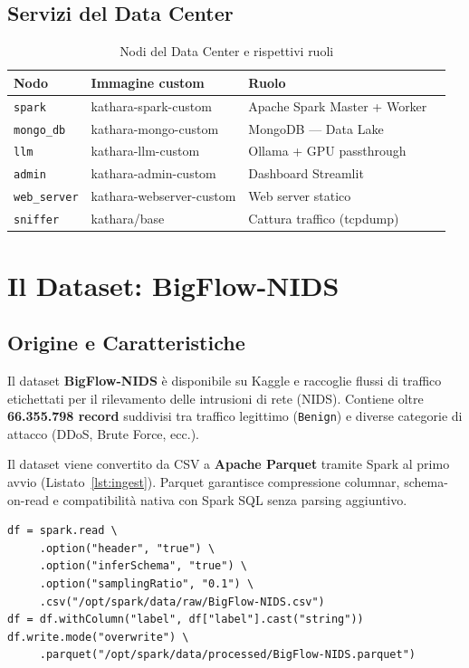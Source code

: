 \documentclass[10pt,a4paper]{article}
\begin{document}
\subsection{Servizi del Data Center}
\begin{table}[H]
\centering
\small
\begin{tabularx}{\textwidth}{@{}lll X@{}}
\toprule
\textbf{Nodo} & \textbf{Immagine custom} & \textbf{Ruolo} \\
\midrule
\texttt{spark}      & kathara-spark-custom    & Apache Spark Master + Worker \\
\texttt{mongo\_db}  & kathara-mongo-custom    & MongoDB — Data Lake \\
\texttt{llm}        & kathara-llm-custom      & Ollama + GPU passthrough \\
\texttt{admin}      & kathara-admin-custom    & Dashboard Streamlit \\
\texttt{web\_server}& kathara-webserver-custom& Web server statico \\
\texttt{sniffer}    & kathara/base            & Cattura traffico (tcpdump) \\
\bottomrule
\end{tabularx}
\caption{Nodi del Data Center e rispettivi ruoli}
\end{table}

\section{Il Dataset: BigFlow-NIDS}

\subsection{Origine e Caratteristiche}
Il dataset \textbf{BigFlow-NIDS} è disponibile su Kaggle e raccoglie flussi di traffico etichettati
per il rilevamento delle intrusioni di rete (NIDS). Contiene oltre \textbf{66.355.798 record}
suddivisi tra traffico legittimo (\texttt{Benign}) e diverse categorie di attacco (DDoS, Brute Force, ecc.).

Il dataset viene convertito da CSV a \textbf{Apache Parquet} tramite Spark al primo avvio
(Listato~\ref{lst:ingest}). Parquet garantisce compressione columnar, schema-on-read e
compatibilità nativa con Spark SQL senza parsing aggiuntivo.

\begin{lstlisting}[style=pystyle, caption={Ingestione CSV e conversione in Parquet}, label=lst:ingest]
df = spark.read \
     .option("header", "true") \
     .option("inferSchema", "true") \
     .option("samplingRatio", "0.1") \
     .csv("/opt/spark/data/raw/BigFlow-NIDS.csv")
df = df.withColumn("label", df["label"].cast("string"))
df.write.mode("overwrite") \
     .parquet("/opt/spark/data/processed/BigFlow-NIDS.parquet")
\end{lstlisting}
\end{document}
